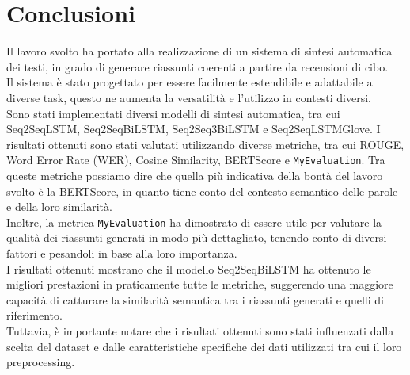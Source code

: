 \section{Conclusioni}
Il lavoro svolto ha portato alla realizzazione di un sistema di sintesi automatica dei testi, in grado di generare riassunti coerenti a partire da recensioni di cibo.\\
Il sistema \`e stato progettato per essere facilmente estendibile e adattabile a diverse task, questo ne aumenta la versatilit\`a e l'utilizzo in contesti diversi.\\
Sono stati implementati diversi modelli di sintesi automatica, tra cui Seq2SeqLSTM, Seq2SeqBiLSTM, Seq2Seq3BiLSTM e Seq2SeqLSTMGlove.
I risultati ottenuti sono stati valutati utilizzando diverse metriche, tra cui ROUGE, Word Error Rate (WER), Cosine Similarity, BERTScore e \texttt{MyEvaluation}.
Tra queste metriche possiamo dire che quella più indicativa della bontà del lavoro svolto è la BERTScore, in quanto tiene conto del contesto semantico delle parole e della loro similarità.\\
Inoltre, la metrica \texttt{MyEvaluation} ha dimostrato di essere utile per valutare la qualità dei riassunti generati in modo più dettagliato, tenendo conto di diversi fattori e pesandoli in base alla loro importanza.\\
I risultati ottenuti mostrano che il modello Seq2SeqBiLSTM ha ottenuto le migliori prestazioni in praticamente tutte le metriche, suggerendo una maggiore capacità di catturare la similarità semantica tra i riassunti generati e quelli di riferimento.\\
Tuttavia, \`e importante notare che i risultati ottenuti sono stati influenzati dalla scelta del dataset e dalle caratteristiche specifiche dei dati utilizzati tra cui il loro preprocessing.\\

